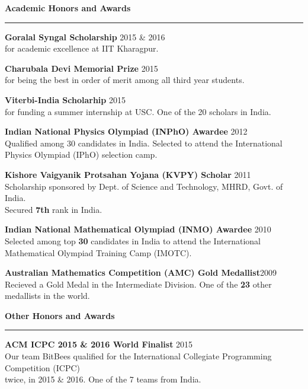 \documentclass[10pt]{article}
\newcommand{\heading}[1]{
 {\large \textbf{#1}}
  \vspace{0.4em}
  \hrule
  \vspace{0.4em}
}
\newcommand{\EntryGap}{\vspace{0.8em}}
\newcommand{\SmallEntryGap}{\vspace{0.4em}}
\begin{document}

\EntryGap
\heading{Academic Honors and Awards}
 \SmallEntryGap
 
 \textbf{Goralal Syngal Scholarship} \hfill 2015 \& 2016\\
 for academic excellence at IIT Kharagpur.
 \SmallEntryGap
 
 \textbf{Charubala Devi Memorial Prize} \hfill 2015\\
  for being the best in order of merit among all third year students.
  \SmallEntryGap
  
 \textbf{Viterbi-India Scholarhip} \hfill 2015\\
  for funding a summer internship at USC. One of the 20 scholars in India.
  \SmallEntryGap
  
 \textbf{Indian National Physics Olympiad (INPhO) Awardee} \hfill 2012\\
  Qualified among 30 candidates in India. Selected to attend the 
  International Physics Olympiad (IPhO) selection camp.
  \SmallEntryGap
  
 \textbf{Kishore Vaigyanik Protsahan Yojana (KVPY) Scholar} \hfill 2011\\
  Scholarship sponsored by Dept. of Science and Technology, MHRD, Govt. of India.\\
  Secured \textbf{7th} rank in India.
  \SmallEntryGap
  
 \textbf{Indian National Mathematical Olympiad (INMO) Awardee} \hfill 2010\\
  Selected among top \textbf{30} candidates in India to attend the International Mathematical Olympiad Training Camp (IMOTC).
  \SmallEntryGap
  
 \textbf{Australian Mathematics Competition (AMC) Gold Medallist}\hfill 2009\\
  Recieved a Gold Medal in the Intermediate Division. One of the \textbf{23} other medallists in the world.



\EntryGap
\heading{Other Honors and Awards}
\SmallEntryGap
\textbf{ACM ICPC 2015 \& 2016 World Finalist} \hfill 2015\\
Our team BitBees qualified for the International Collegiate Programming Competition (ICPC)\\
twice, in 2015 \& 2016. One of the 7 teams from India.
\end{document}
